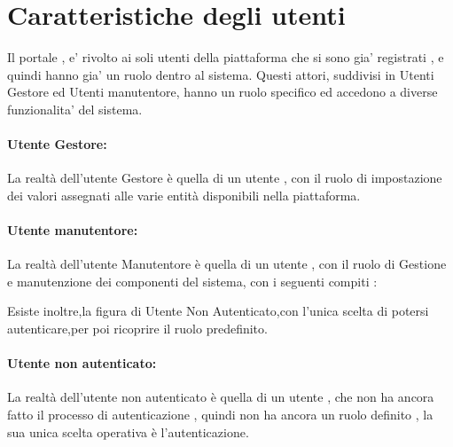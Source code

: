 \section{Caratteristiche degli utenti}

Il portale , e' rivolto ai soli utenti della piattaforma che si sono gia' registrati , e quindi hanno gia' un ruolo dentro al sistema.
Questi attori, suddivisi in Utenti Gestore ed Utenti manutentore, hanno un ruolo specifico ed accedono a diverse funzionalita' del sistema.

\paragraph{Utente Gestore:} La realtà dell'utente Gestore è quella di un utente , con il ruolo di impostazione dei valori assegnati alle varie entità disponibili nella piattaforma.

\paragraph{Utente manutentore:} La realtà dell'utente Manutentore è quella di un utente , con il ruolo di Gestione e manutenzione dei componenti del sistema, con i seguenti compiti :

Esiste inoltre,la figura di Utente Non Autenticato,con l'unica scelta di potersi autenticare,per poi ricoprire il ruolo predefinito.

\paragraph{Utente non autenticato:} La realtà dell'utente non autenticato è quella di un utente , che non ha ancora fatto il processo di autenticazione , quindi non ha ancora un ruolo definito , la sua unica scelta operativa è l'autenticazione.
